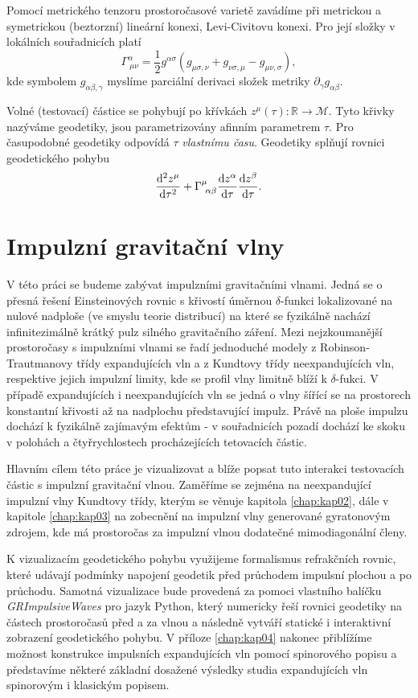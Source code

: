 Pomocí metrického tenzoru prostoročasové varietě zavádíme při metrickou a symetrickou (beztorzní) lineární konexi, Levi-Civitovu konexi. Pro její složky v lokálních souřadnicích platí
\begin{equation}
    \Gamma^\alpha_{~\mu \nu} = \frac{1}{2} g^{\alpha \sigma} \left( g_{\mu \sigma,\nu} + g_{\nu \sigma, \mu} - g_{\mu \nu, \sigma}\right),
\end{equation}
kde symbolem $g_{\alpha \beta, \gamma}$ myslíme parciální derivaci složek metriky $\partial_\gamma g_{\alpha \beta}$.

Volné (testovací) částice se pohybují po křívkách $z^\mu(\tau): \mathbb{R} \to \mathcal{M}$. Tyto křivky nazýváme geodetiky, jsou parametrizovány afinním parametrem $\tau$. Pro časupodobné geodetiky
odpovídá $\tau$ \emph{vlastnímu času}. Geodetiky splňují rovnici geodetického pohybu
\begin{equation}
    \frac{\mathrm{d}^2 z^\mu}{\mathrm{d} \tau^2} + \Gamma^\mu_{~\alpha \beta} \frac{\mathrm{d} z^\alpha}{\mathrm{d} \tau} \frac{\mathrm{d} z^\beta}{\mathrm{d} \tau}.
\end{equation}


\section*{Impulzní gravitační vlny}
V této práci se budeme zabývat impulzními gravitačními vlnami. Jedná se o přesná řešení Einsteinových rovnic s křivostí úměrnou $\delta$-funkci lokalizované
na nulové nadploše (ve smyslu teorie distribucí) na které se fyzikálně nachází infinitezimálně krátký pulz silného gravitačního záření.
Mezi nejzkoumanější prostoročasy s impulzními vlnami se řadí jednoduché modely z Robinson-Trautmanovy třídy expandujících vln a z Kundtovy třídy
neexpandujících vln, respektive jejich impulzní limity, kde se profil vlny limitně blíží k $\delta$-fukci.
V případě expandujících i neexpandujících vln se jedná o vlny šířící se na prostorech konstantní křivosti až na nadplochu představující impulz.
Právě na ploše impulzu dochází k fyzikálně zajímavým efektům - v souřadnicích pozadí dochází ke skoku v polohách a čtyřrychlostech
procházejících tetovacích částic.

Hlavním cílem této práce je vizualizovat a blíže popsat tuto interakci testovacích částic s impulzní gravitační vlnou. Zaměříme se
zejména na neexpandující impulzní vlny Kundtovy třídy, kterým se věnuje kapitola \ref{chap:kap02}, dále v kapitole \ref{chap:kap03} na zobecnění na impulzní vlny generované
gyratonovým zdrojem, kde má prostoročas za impulzní vlnou dodatečné mimodiagonální členy.

K vizualizacím geodetického pohybu využijeme
formalismus refrakčních rovnic, které udávají podmínky napojení geodetik před průchodem impulsní plochou a po průchodu.
Samotná vizualizace bude provedená za pomoci vlastního balíčku \emph{GRImpulsiveWaves} pro jazyk Python, který numericky řeší rovnici geodetiky na
částech prostoročasů před a za vlnou a následně vytváří statické i interaktivní zobrazení geodetického pohybu.
V příloze \ref{chap:kap04} nakonec přiblížíme možnost konstrukce impulsních expandujících vln pomocí spinorového popisu a představíme některé základní
dosažené výsledky studia expandujících vln spinorovým i klasickým popisem.


\clearpage